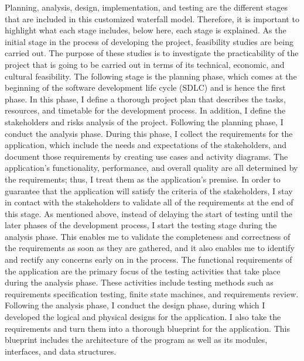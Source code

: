 \begin{justify}
\vspace{0.25cm}
\newendline Planning, analysis, design, implementation, and testing are the different stages that are included in this customized waterfall model. Therefore, it is important to highlight what each stage includes, below here, each stage is explained.
\vspace{0.25cm}
\newendline As the initial stage in the process of developing the project, feasibility studies are being carried out. The purpose of these studies is to investigate the practicability of the project that is going to be carried out in terms of its technical, economic, and cultural feasibility. The following stage is the planning phase, which comes at the beginning of the software development life cycle (SDLC) and is hence the first phase. In this phase, I define a thorough project plan that describes the tasks, resources, and timetable for the development process. In addition, I define the stakeholders and risks analysis of the project.
\vspace{0.25cm}
\newendline Following the planning phase, I conduct the analysis phase. During this phase, I collect the requirements for the application, which include the needs and expectations of the stakeholders, and document those requirements by creating use cases and activity diagrams. The application's functionality, performance, and overall quality are all determined by the requirements; thus, I treat them as the application's premise. In order to guarantee that the application will satisfy the criteria of the stakeholders, I stay in contact with the stakeholders to validate all of the requirements at the end of this stage.
\vspace{0.25cm}
\newendline As mentioned above, instead of delaying the start of testing until the later phases of the development process, I start the testing stage during the analysis phase. This enables me to validate the completeness and correctness of the requirements as soon as they are gathered, and it also enables me to identify and rectify any concerns early on in the process. The functional requirements of the application are the primary focus of the testing activities that take place during the analysis phase. These activities include testing methods such as requirements specification testing, finite state machines, and requirements review.
\vspace{0.25cm}
\newendline Following the analysis phase, I conduct the design phase, during which I developed the logical and physical designs for the application. I also take the requirements and turn them into a thorough blueprint for the application. This blueprint includes the architecture of the program as well as its modules, interfaces, and data structures.

\end{justify}
